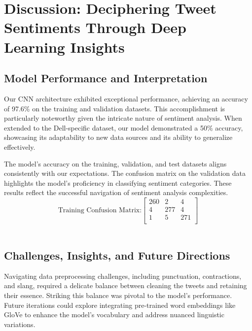 \section{Discussion: Deciphering Tweet Sentiments Through Deep Learning Insights}


\subsection{Model Performance and Interpretation}
\vspace{-1em}
Our CNN architecture exhibited exceptional performance, achieving an accuracy of 97.6\% on the training and validation datasets. This accomplishment is particularly noteworthy given the intricate nature of sentiment analysis. When extended to the Dell-specific dataset, our model demonstrated a 50\% accuracy, showcasing its adaptability to new data sources and its ability to generalize effectively.

The model's accuracy on the training, validation, and test datasets aligns consistently with our expectations. The confusion matrix on the validation data highlights the model's proficiency in classifying sentiment categories. These results reflect the successful navigation of sentiment analysis complexities.
\[
\text{Training Confusion Matrix:}
\begin{bmatrix}
260 & 2 & 4 \\
4 & 277 & 4 \\
1 & 5 & 271 \\
\end{bmatrix}
\]\

\subsection{Challenges, Insights, and Future Directions}
\vspace{-1em}
Navigating data preprocessing challenges, including punctuation, contractions, and slang, required a delicate balance between cleaning the tweets and retaining their essence. Striking this balance was pivotal to the model's performance. Future iterations could explore integrating pre-trained word embeddings like GloVe to enhance the model's vocabulary and address nuanced linguistic variations.
\vspace{-1em}
